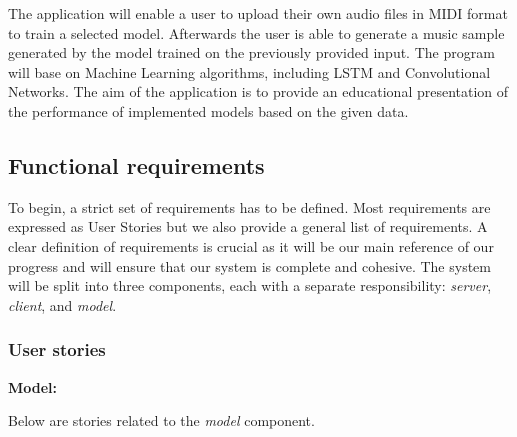 \documentclass{article}
\begin{document}
The application will enable a user to upload their own audio files in MIDI format to train a selected model. Afterwards the user is able to generate a music sample generated by the model trained on the previously provided input. The program will base on Machine Learning algorithms, including LSTM and Convolutional Networks. The aim of the application is to provide an educational presentation of the performance of implemented models based on the given data.

\subsection{Functional requirements}

To begin, a strict set of requirements has to be defined. Most requirements are expressed as User Stories but we also provide a general list of requirements. A clear definition of requirements is crucial as it will be our main reference of our progress and will ensure that our system is complete and cohesive. The system will be split into three components, each with a separate responsibility: \textit{server}, \textit{client}, and \textit{model}.

\subsubsection{User stories}

\newcommand{\AC}{\subitem AC. }

\textbf{\large Model:}

Below are stories related to the \textit{model} component.
\end{document}
